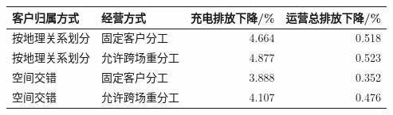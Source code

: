 \begin{tabular*}{0.84\linewidth}{@{\extracolsep{\fill}}llrr@{}}
\toprule
客户归属方式 & 经营方式 & 充电排放下降/\% & 运营总排放下降/\% \\
\midrule
按地理关系划分 & 固定客户分工 & 4.664 & 0.518 \\
按地理关系划分 & 允许跨场重分工 & 4.877 & 0.523 \\
空间交错 & 固定客户分工 & 3.888 & 0.352 \\
空间交错 & 允许跨场重分工 & 4.107 & 0.476 \\
\bottomrule
\end{tabular*}
